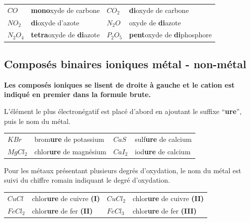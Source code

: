 \documentclass[
  11pt,
  a4paper,
  openany]{book}
\begin{document}
\begin{longtable}[]{@{}
  >{\centering\arraybackslash}p{}
  >{\raggedright\arraybackslash}p{}
  >{\centering\arraybackslash}p{}
  >{\raggedright\arraybackslash}p{}@{}}
\toprule()
\endhead
\(CO\) & \textbf{mono}xyde de carbone & \(CO_2\) & \textbf{di}oxyde de carbone \\
\(NO_2\) & \textbf{di}oxyde d'azote & \(N_2O\) & oxyde de \textbf{di}azote \\
\(N_2O_4\) & \textbf{tetra}oxyde de \textbf{di}azote & \(P_2O_5\) & \textbf{pent}oxyde de \textbf{di}phosphore \\
\bottomrule()
\end{longtable}

\hypertarget{composuxe9s-binaires-ioniques-muxe9tal---non-muxe9tal}{%
\subsection{Composés binaires ioniques \textbar{} métal - non-métal}\label{composuxe9s-binaires-ioniques-muxe9tal---non-muxe9tal}}

\textbf{Les composés ioniques se lisent de droite à gauche et le cation est indiqué en premier dans la formule brute.}

L'élément le plus électronégatif est placé d'abord en ajoutant le suffixe ``\textbf{ure}'', puis le nom du métal.

\begin{longtable}[]{@{}
  >{\centering\arraybackslash}p{}
  >{\raggedright\arraybackslash}p{}
  >{\centering\arraybackslash}p{}
  >{\raggedright\arraybackslash}p{}@{}}
\toprule()
\endhead
\(KBr\) & brom\textbf{ure} de potassium & \(CaS\) & sulf\textbf{ure} de calcium \\
\(MgCl_2\) & chlor\textbf{ure} de magnésium & \(CaI_2\) & iod\textbf{ure} de calcium \\
\bottomrule()
\end{longtable}

Pour les métaux présentant plusieurs degrés d'oxydation, le nom du métal est suivi du chiffre romain indiquant le degré d'oxydation.

\begin{longtable}[]{@{}
  >{\centering\arraybackslash}p{}
  >{\raggedright\arraybackslash}p{}
  >{\centering\arraybackslash}p{}
  >{\raggedright\arraybackslash}p{}@{}}
\toprule()
\endhead
\(CuCl\) & chlor\textbf{ure} de cuivre \textbf{(I)} & \(CuCl_2\) & chlor\textbf{ure} de cuivre \textbf{(II)} \\
\(FeCl_2\) & chlor\textbf{ure} de fer \textbf{(II)} & \(FeCl_3\) & chlor\textbf{ure} de fer \textbf{(III)} \\
\bottomrule()
\end{longtable}
\end{document}
